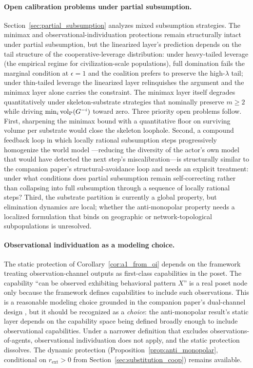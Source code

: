 \paragraph{Open calibration problems under partial subsumption.}
Section~\ref{sec:partial_subsumption} analyzes mixed subsumption
strategies. The minimax and observational-individuation protections
remain structurally intact under partial subsumption, but the
linearized layer's prediction depends on the tail structure of the
cooperative-leverage distribution: under heavy-tailed leverage
(the empirical regime for civilization-scale populations),
full domination fails the marginal condition at $\epsilon = 1$ and
the coalition prefers to preserve the high-$\lambda$ tail; under
thin-tailed leverage the linearized layer relinquishes the argument
and the minimax layer alone carries the constraint. The minimax
layer itself degrades quantitatively under skeleton-substrate
strategies that nominally preserve $m \geq 2$ while driving
$\min_i {\operatorname{vol}_{\mathrm{P}}}(G^{-i})$ toward zero. Three priority open problems
follow. First, sharpening the minimax bound with a quantitative
floor on surviving volume per substrate would close the skeleton
loophole. Second, a compound feedback loop in which locally
rational subsumption steps progressively homogenize the world model
---reducing the diversity of the actor's own model that would have
detected the next step's miscalibration---is structurally similar
to the companion paper's structural-avoidance loop and needs an
explicit treatment: under what conditions does partial subsumption
remain self-correcting rather than collapsing into full subsumption
through a sequence of locally rational steps? Third, the substrate
partition is currently a global property, but elimination dynamics
are local; whether the anti-monopolar property needs a localized
formulation that binds on geographic or network-topological
subpopulations is unresolved.

\paragraph{Observational individuation as a modeling choice.}
The static protection of Corollary~\ref{cor:a1_from_oi} depends on the
framework treating observation-channel outputs as first-class capabilities
in the poset. The capability ``can be observed exhibiting behavioral pattern
$X$'' is a real poset node only because the framework defines capabilities
to include such observations. This is a reasonable modeling choice grounded
in the companion paper's dual-channel design \citep{lasser2026poset},
but it should be recognized as a
\emph{choice}: the anti-monopolar result's static layer depends on the
capability space being defined broadly enough to include observational
capabilities. Under a narrower definition that excludes observations-of-agents,
observational individuation does not apply, and the static protection
dissolves. The dynamic protection (Proposition~\ref{prop:anti_monopolar},
conditional on $r_{\mathrm{ext}} > 0$ from
Section~\ref{sec:substitution_coop}) remains available.

